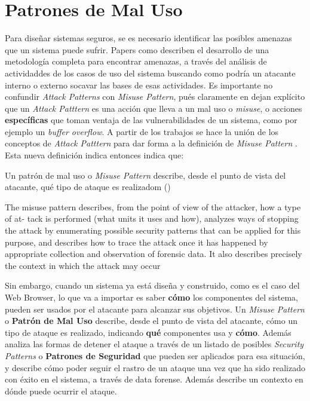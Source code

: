 \section{Patrones de Mal Uso}
Para diseñar sistemas seguros, se es necesario identificar las posibles amenazas que un sistema puede sufrir. Papers como \cite{fernandez2013security, fernandez2006defining, fernandez2007attack, braz2008eliciting} describen el desarrollo de una metodología completa para encontrar amenazas, a través del análisis de actividaddes de los casos de uso del sistema buscando como podría un atacante interno o externo socavar las bases de esas actividades. Es importante no confundir \textit{Attack Patterns} con \textit{Misuse Pattern}, pués claramente en \cite{ModMisusePatt, fernandez2013security} dejan explícito que un \textit{Attack Patttern} es una acción que lleva a un mal uso o \textit{misuse}, o acciones \textbf{específicas} que toman ventaja de las vulnerabilidades de un sistema, como por ejemplo un \textit{buffer overflow}. A partir de los trabajos \cite{fernandez2007attack, yoshioka2006development, yoshioka2007integration}  se hace la unión de los conceptos de \textit{Attack Patttern} para dar forma a la definición de \textit{Misuse Pattern} \cite{ModMisusePatt, pelaez2009misuse, fernandez2010worm, hashizume2011misuse, munoz2011misuse, fernandez2012misuse, alkazimi2014, encinamisuse}. Esta nueva definición indica entonces indica que:
\begin{center}
    Un patrón de mal uso o \textit{Misuse Pattern} describe, desde el punto de vista del atacante, qué tipo de ataque es realizadom ()
\end{center}
The misuse pattern describes, from the point of view of the attacker, how a type of at-
tack is performed (what units it uses and how), analyzes ways of stopping the attack by
enumerating possible security patterns that can be applied for this purpose, and describes
how to trace the attack once it has happened by appropriate collection and observation
of forensic data. It also describes precisely the context in which the attack may occur



Sin embargo, cuando un sistema ya está diseña y construido, como es el caso del Web Browser, lo que va a importar es saber \textbf{cómo} los componentes del sistema, pueden ser usados por el atacante para alcanzar sus objetivos. Un \textit{Misuse Pattern} o \textbf{Patrón de Mal Uso} describe, desde el punto de vista del atacante, cómo un tipo de ataque es realizado, indicando \textbf{qué} componentes usa y \textbf{cómo}. Además analiza las formas de detener el ataque a través de un listado de posibles \textit{Security Patterns} o \textbf{Patrones de Seguridad} que pueden ser aplicados para esa situación, y describe cómo poder seguir el rastro de un ataque una vez que ha sido realizado con éxito en el sistema, a través de data forense. Además describe un contexto en dónde puede ocurrir el ataque.

